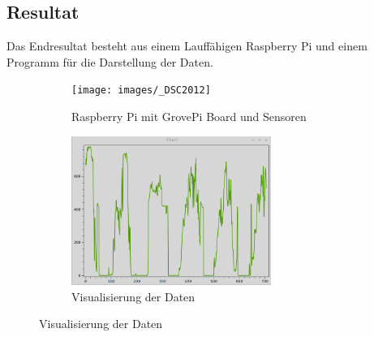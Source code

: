 \subsection*{Resultat}
Das Endresultat besteht aus einem Lauffähigen Raspberry Pi und einem Programm für die Darstellung der Daten.
\begin{figure}[htb]
	\begin{subfigure}[b]{0.45\linewidth}
		\centering
		\texttt{[image: images/\_DSC2012]}
		\caption{Raspberry Pi mit GrovePi Board und Sensoren}
	\end{subfigure}
	\begin{subfigure}[b]{.45\linewidth}
		\centering
		\includegraphics[width=6.5cm]{images/resultat}
		\caption{Visualisierung der Daten}
	\end{subfigure}
\end{figure}
